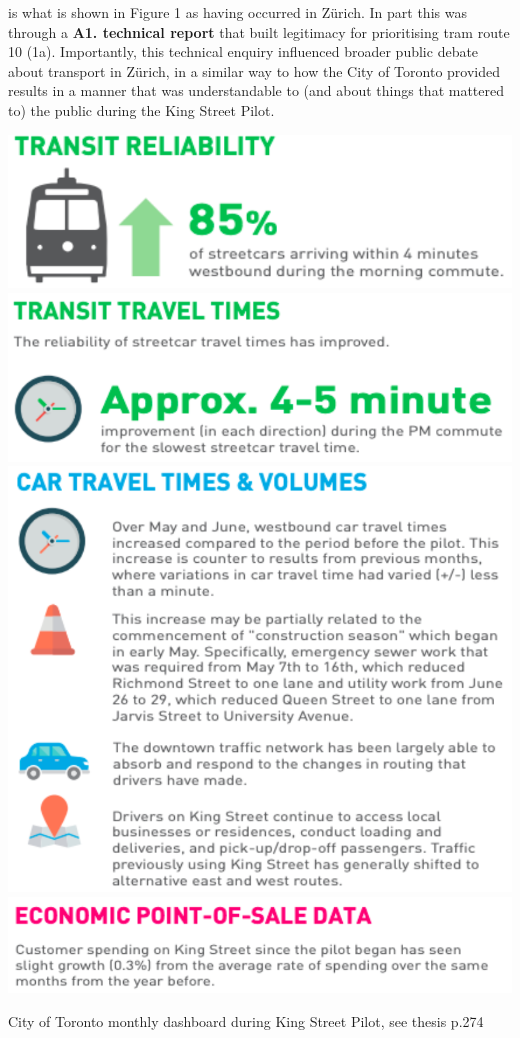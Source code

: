 \documentclass{tufte-handout}
\begin{document}
 is what is shown in Figure 1 as having occurred in Zürich. In part this was through a \textbf{A1. technical report} that built legitimacy for prioritising tram route 10 (1a). Importantly, this technical enquiry influenced broader public debate about transport in Zürich, in a similar way to how the City of Toronto provided results in a manner that was understandable to (and about things that mattered to) the public during the King Street Pilot. 
\begin{marginfigure}%
  \includegraphics[width=\linewidth]{Toronto_dashboard_1}
    \includegraphics[width=\linewidth]{Toronto_dashboard_2}
        \includegraphics[width=\linewidth]{Toronto_dashboard_3}
        \includegraphics[width=\linewidth]{Toronto_dashboard_4}
  \caption{City of Toronto monthly dashboard during King Street Pilot, see thesis p.274}
  \label{fig:Toronto_dashboard}
\end{marginfigure}
\end{document}
